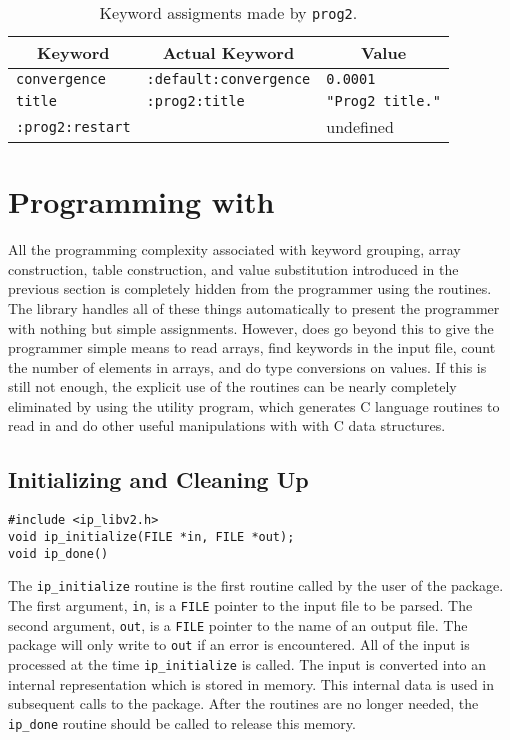 \begin{table}[e]
\centering
\begin{tabular}{|l|l|l|}
\hline
\multicolumn{1}{|c}{Keyword}
  & \multicolumn{1}{c}{Actual Keyword}
  & \multicolumn{1}{c|}{Value} \\
\hline
\verb|convergence| & \verb|:default:convergence| & \verb|0.0001| \\
\verb|title| & \verb|:prog2:title| & \verb|"Prog2 title."| \\
\verb|:prog2:restart| & & undefined \\
\hline
\end{tabular}
\caption{Keyword assigments made by {\tt prog2}.}
\label{progtwoassign}
\end{table}


\section{Programming with \libip{}}
All the programming complexity associated with keyword grouping,
array construction, table construction, and value substitution introduced
in the previous section is completely hidden from the programmer using the
\libip{} routines.  The library handles all of these things automatically
to present the programmer with nothing but simple  \lit{=}
 assignments.  However, \libip{} does go beyond this to
give the programmer simple means to read arrays, find keywords
in the input file, count the number of elements in arrays, and do type
conversions on values.  If this is still not enough, the explicit use of
the \libip{} routines can be nearly completely eliminated
by using the \sgen{} utility program, which generates C language
routines to read in and do other useful manipulations with
with C data structures.

\subsection{Initializing and Cleaning Up}
\begin{verbatim}
#include <ip_libv2.h>
void ip_initialize(FILE *in, FILE *out);
void ip_done()
\end{verbatim}
The \verb|ip_initialize| routine is the first routine called by the user
of the \libip{} package.  The first argument, \verb|in|, is a
\verb|FILE| pointer to the input file to be parsed.  The second argument,
\verb|out|, is a \verb|FILE| pointer to the name of an output file.
The \libip{} package will only write to \verb|out| if an error is
encountered.  All of the input is processed at the time \verb|ip_initialize|
is called.  The input is converted into an internal representation which
is stored in memory.  This internal data is used in subsequent calls
to the \libip{} package.  After the \libip{} routines are no longer needed,
the \verb|ip_done| routine should be called to release this memory.


